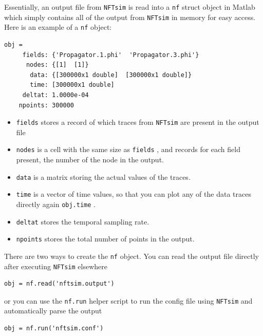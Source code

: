 \documentclass[12pt,a4paper]{article}
\newcommand{\type}[1]{{\small\small\tt #1} }
\newcommand{\NF}[0]{\type{NFTsim}}
\begin{document}
Essentially, an output file from \NF is read into a \type{nf} struct object in Matlab which simply contains all of the output from \NF in memory for easy access. Here is an example of a \type{nf} object:
\begin{lstlisting}
obj =
     fields: {'Propagator.1.phi'  'Propagator.3.phi'}
      nodes: {[1]  [1]}
       data: {[300000x1 double]  [300000x1 double]}
       time: [300000x1 double]
     deltat: 1.0000e-04
    npoints: 300000
\end{lstlisting}
\begin{itemize}
\item \type{fields} stores a record of which traces from \NF are present in the output file
\item \type{nodes} is a cell with the same size as \type{fields}, and records for each field present, the number of the node in the output.
\item \type{data} is a matrix storing the actual values of the traces.
\item \type{time} is a vector of time values, so that you can plot any of the data traces directly again \type{obj.time}.
\item \type{deltat} stores the temporal sampling rate.
\item \type{npoints} stores the total number of points in the output.
\end{itemize}

There are two ways to create the \type{nf} object. You can read the output file directly after executing \NF elsewhere

\begin{lstlisting}
obj = nf.read('nftsim.output')
\end{lstlisting}

or you can use the \type{nf.run} helper script to run the config file using \NF and automatically parse the output

\begin{lstlisting}
obj = nf.run('nftsim.conf')
\end{lstlisting}

\end{document}
